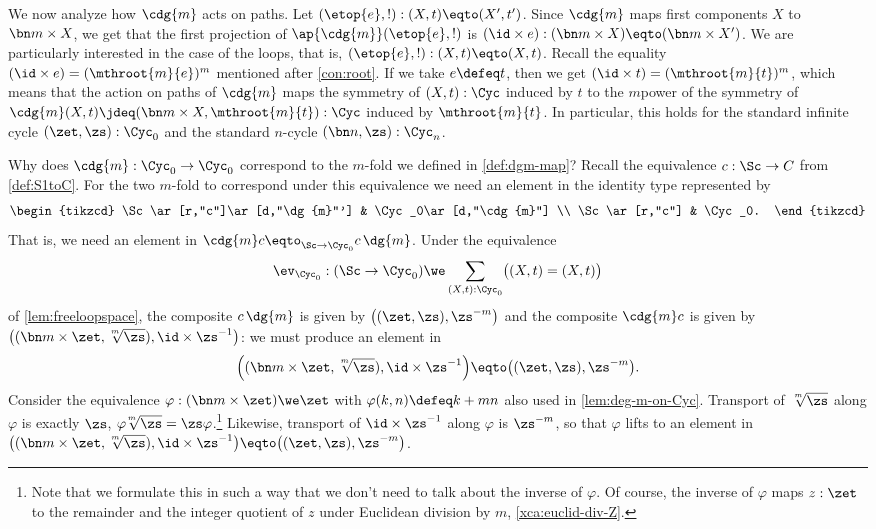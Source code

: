 We now analyze how $\cdg{m}$ acts on paths.
Let $({\etop{e}},{!}):(X,t)\eqto(X',t')$.
Since $\cdg{m}$ maps first components $X$ to $\bn m\times X$, we get that
the first projection of $\ap{\cdg{m}}({\etop{e}},{!})$ is
$(\id\times e) : (\bn m\times X)\eqto(\bn m\times X')$.
We are particularly interested in the case of the loops,
that is, $({\etop{e}},{!}):(X,t)\eqto(X,t)$.
Recall the equality $(\id\times e) = (\mthroot{m}{e})^m$ mentioned 
after \cref{con:root}. If we take $e\defeq t$,
then we get $(\id\times t) = (\mthroot{m}{t})^m$, which means that
the action on paths of $\cdg{m}$ maps the symmetry of 
$(X,t):\Cyc$ induced by $t$ to the $m$\th power of the symmetry of 
$\cdg{m}(X,t)\jdeq(\bn m\times X,\mthroot{m}{t}):\Cyc$
induced by $\mthroot{m}{t}$.
In particular, this holds for the standard infinite cycle $(\zet,\zs):\Cyc_0$
and the standard $n$-cycle $(\bn n,\zs):\Cyc_n$.

Why does $\cdg{m}:\Cyc_0\to\Cyc_0$
correspond to the $m$-fold \covering we defined in \cref{def:dgm-map}?
Recall the equivalence $c:\Sc\to C$ from \cref{def:S1toC}.
For the two $m$-fold \coverings to correspond under this equivalence
we need an element in the identity type represented by
\[
  \begin{tikzcd}
    \Sc\ar[r,"c"]\ar[d,"\dg{m}"'] & \Cyc_0\ar[d,"\cdg{m}"] \\
    \Sc\ar[r,"c"] & \Cyc_0.
  \end{tikzcd}
\]
That is, we need an element in $\cdg{m}c\eqto_{\Sc\to\Cyc_0}c\,\dg{m}$.
Under the equivalence
\[
  \ev_{\Cyc_0}:(\Sc\to\Cyc_0)\we \sum_{(X,t):\Cyc_0}\bigl((X,t)=(X,t)\bigr)
\]
of \cref{lem:freeloopspace},
the composite $c\,\dg{m}$ is given by $\bigl((\zet,\zs),\zs^{-m}\bigr)$
and the composite $\cdg{m}c$ is given by
$\bigl((\bn m\times\zet,\sqrt[\uproot{2}m]{\zs}),\id\times\zs^{-1}\bigr)$:
we must produce an element in
\[
  \Bigl((\bn m\times\zet,\sqrt[\uproot{2}m]{\zs}),\id\times\zs^{-1}\Bigr)
  \eqto \bigl((\zet,\zs),\zs^{-m}\bigr).
\]
Consider the equivalence  $\varphi: (\bn m\times \zet)\we\zet$ with 
$\varphi(k,n)\defeq k+mn$ also used in \cref{lem:deg-m-on-Cyc}.
Transport of $\sqrt[\uproot{2}m]\zs$ along $\varphi$ is exactly $\zs$,
\ie $\varphi\!\sqrt[\uproot{2}m]\zs=\zs\varphi$.\footnote{%
Note that we formulate this in such a way that we don't need to talk about the inverse of $\varphi$.
Of course, the inverse of $\varphi$ maps $z:\zet$ to the remainder and 
the integer quotient of $z$ under Euclidean division by $m$, 
\cref{xca:euclid-div-Z}.}
Likewise, transport of $\id\times\zs^{-1}$ along $\varphi$ is $\zs^{-m}$,
so that $\varphi$ lifts to an element in
$\bigl((\bn m\times\zet,\sqrt[\uproot{2}m]{\zs}), \id\times\zs^{-1}\bigr)
\eqto \bigl((\zet,\zs),\zs^{-m}\bigr)$.

